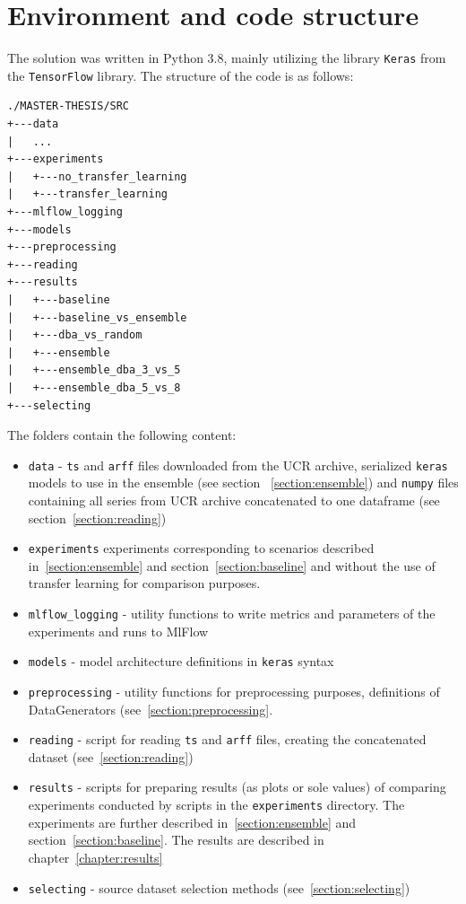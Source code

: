 \documentclass[a4paper,11pt,twoside]{report}
\theoremstyle{definition}
\begin{document}
\section{Environment and code structure}
The solution was written in Python 3.8, mainly utilizing the library \texttt{Keras} from the \texttt{TensorFlow} library. The structure of the code is as follows:

\begin{verbatim}
./MASTER-THESIS/SRC
+---data
|   ...
+---experiments
|   +---no_transfer_learning
|   +---transfer_learning
+---mlflow_logging
+---models
+---preprocessing
+---reading
+---results
|   +---baseline
|   +---baseline_vs_ensemble
|   +---dba_vs_random
|   +---ensemble
|   +---ensemble_dba_3_vs_5
|   +---ensemble_dba_5_vs_8
+---selecting
\end{verbatim}

The folders contain the following content:
\begin{itemize}
\item \texttt{data} - \texttt{ts} and \texttt{arff} files downloaded from the UCR archive,   serialized \texttt{keras} models to use in the ensemble (see section ~\ref{section:ensemble}) and \texttt{numpy} files containing all series from UCR archive concatenated to one dataframe (see section~\ref{section:reading})
\item \texttt{experiments}  experiments corresponding to scenarios described in~\ref{section:ensemble} and section~\ref{section:baseline} and without the use of transfer learning for comparison purposes.
\item \texttt{mlflow\_logging} - utility functions to write metrics and parameters of the experiments and runs to MlFlow
\item \texttt{models} - model architecture definitions in \texttt{keras} syntax
\item \texttt{preprocessing} - utility functions for preprocessing purposes, definitions of DataGenerators (see~\ref{section:preprocessing}.
\item \texttt{reading} - script for reading \texttt{ts} and \texttt{arff} files, creating the concatenated dataset (see~\ref{section:reading})
\item \texttt{results} - scripts for preparing results (as plots or sole values) of comparing experiments conducted by scripts in the \texttt{experiments} directory. The experiments are further described in~\ref{section:ensemble} and section~\ref{section:baseline}. The results are described in chapter~\ref{chapter:results}
\item \texttt{selecting} - source dataset selection methods (see~\ref{section:selecting})

\end{itemize}
\end{document}
